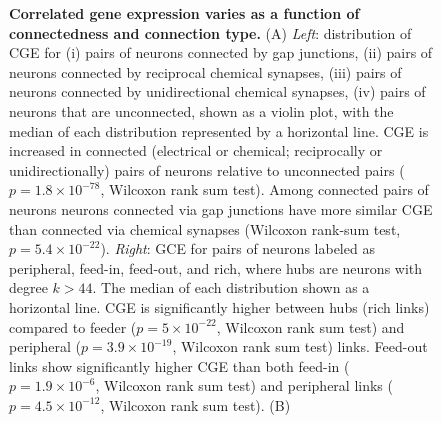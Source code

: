 \begin{figure}[!h]
\caption{{\bf Correlated gene expression varies as a function of connectedness and connection type.}
(A) \textit{Left}: distribution of CGE for (i) pairs of neurons connected by gap junctions, (ii) pairs of neurons connected by reciprocal chemical synapses, (iii) pairs of neurons connected by unidirectional chemical synapses, (iv) pairs of neurons that are unconnected, shown as a violin plot, with the median of each distribution represented by a horizontal line.
CGE is increased in connected (electrical or chemical; reciprocally or unidirectionally) pairs of neurons relative to unconnected pairs ($p = 1.8 \times 10^{-78}$, Wilcoxon rank sum test).
Among connected pairs of neurons neurons connected via gap junctions have more similar CGE than connected via chemical synapses (Wilcoxon rank-sum test, $p = 5.4 \times 10^{-22}$).
\textit{Right}: GCE for pairs of neurons labeled as peripheral, feed-in, feed-out, and rich, where hubs are neurons with degree $k>44$. The median of each distribution shown as a horizontal line.
CGE is significantly higher between hubs (rich links) compared to feeder ($p = 5 \times 10^{-22}$, Wilcoxon rank sum test) and peripheral ($p = 3.9 \times 10^{-19}$, Wilcoxon rank sum test) links.
Feed-out links show significantly higher CGE than both feed-in ($p = 1.9 \times 10^{-6}$, Wilcoxon rank sum test) and peripheral links ($p = 4.5 \times 10^{-12}$, Wilcoxon rank sum test).
(B)
}
\end{figure}
